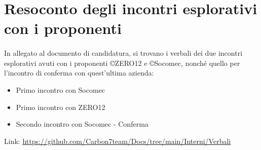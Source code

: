 \section{Resoconto degli incontri esplorativi con i proponenti}
\paragraph{}
In allegato al documento di candidatura, si trovano i verbali dei due incontri
esplorativi avuti con i proponenti \copyright ZERO12 e \copyright Socomec,
nonché quello per l'incontro di conferma con quest'ultima azienda:
\begin{itemize}
  \item Primo incontro con Socomec
  \item Primo incontro con ZERO12
  \item Secondo incontro con Socomec - Conferma
\end{itemize}
Link: \textcolor{blue}{\underline{\url{https://github.com/Carbon7team/Docs/tree/main/Interni/Verbali}}}
